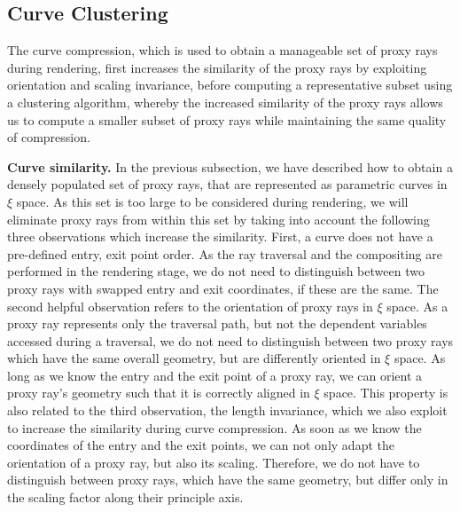 \documentclass[journal]{vgtc}                %
\begin{document}
\subsection{Curve Clustering}\label{subsec:curvecompression}
The curve compression, which is used to obtain a manageable set of proxy rays during rendering, first increases the similarity of the proxy rays by exploiting orientation and scaling invariance, before computing a representative subset using a clustering algorithm, whereby the increased similarity of the proxy rays allows us to compute a smaller subset of proxy rays while maintaining the same quality of compression.

\noindent \textbf{Curve similarity.} In the previous subsection, we have described how to obtain a densely populated set of proxy rays, that are represented as parametric curves in $\xi$ space. As this set is too large to be considered during rendering, we will eliminate proxy rays from within this set by taking into account the following three observations which increase the similarity. First, a curve does not have a pre-defined entry, exit point order. As the ray traversal and the compositing are performed in the rendering stage, we do not need to distinguish between two proxy rays with swapped entry and exit coordinates, if these are the same. The second helpful observation refers to the orientation of proxy rays in $\xi$ space. As a proxy ray represents only the traversal path, but not the dependent variables accessed during a traversal, we do not need to distinguish between two proxy rays which have the same overall geometry, but are differently oriented in $\xi$ space. As long as we know the entry and the exit point of a proxy ray, we can orient a proxy ray's geometry such that it is correctly aligned in $\xi$ space. This property is also related to the third observation, the length invariance, which we also exploit to increase the similarity during curve compression. As soon as we know the coordinates of the entry and the exit points, we can not only adapt the orientation of a proxy ray, but also its scaling. Therefore, we do not have to distinguish between proxy rays, which have the same geometry, but differ only in the scaling factor along their principle axis.
\end{document}
